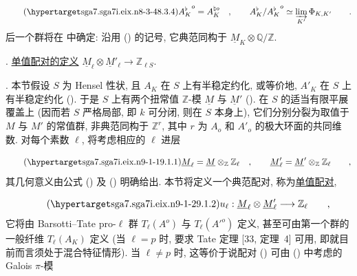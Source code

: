 \begin{equation}\tag{\SGARefTarget{sga7.sga7i.eix.n8-3-4}{8.3.4}}
{A_{K}^{\flat}}^{o}=A_{K}^{\natural o} \quad , \qquad
A^{\flat}_{K}/{A_{K}^{\flat}}^{o}
 \simeq \varinjlim_{K'}\Phi_{K,K'} \qquad .
\end{equation}
后一个群将在  中确定: 沿用 () 的记号, 它典范同构于 $\underline{M}_{K}\otimes\mathbb{Q}/\mathbb{Z}$.



\medskip
{}. \underline{单值配对的定义}
$\underline{M}_{\ell}\otimes\underline{M}'_{\ell}
 \longrightarrow \mathbb{Z}_{\ell S}$.

\medskip
\noindent
{}. 本节假设 $S$ 为 Hensel 性状, 且 $A_K$ 在 $S$ 上有半稳定约化, 或等价地, $A'_K$ 在 $S$ 上有半稳定约化 (). 于是 $S$ 上有两个扭常值 $\mathbb{Z}$-模 $\underline{M}$ 与 $\underline{M}'$ (). 在 $S$ 的适当有限平展覆盖上 (因而若 $S$ 严格局部, 即 $k$ 可分闭, 则在 $S$ 本身上), 它们分别分裂为取值于 $M$ 与 $M'$ 的常值群, 非典范同构于 $\mathbb{Z}^{r}$, 其中 $r$ 为 $A_o$ 和 $A'_o$ 的极大环面的共同维数. 对每个素数 $\ell$, 将考虑相应的 $\ell$ 进层

\begin{equation}\tag{\SGARefTarget{sga7.sga7i.eix.n9-1-1}{9.1.1}}
\underline{M}_{\ell}=\underline{M}\otimes_{\mathbb{Z}}\mathbb{Z}_{\ell}
 \quad , \qquad
\underline{M}'_{\ell}=\underline{M}'\otimes_{\mathbb{Z}}\mathbb{Z}_{\ell}
 \qquad ,
\end{equation}
其几何意义由公式 () 及 () 明确给出. 本节将定义一个典范配对, 称为\underline{单值配对},

\begin{equation}\tag{\SGARefTarget{sga7.sga7i.eix.n9-1-2}{9.1.2}}
u_{\ell}:\underline{M}_{\ell}\otimes\underline{M}'_{\ell}
 \longrightarrow\mathbb{Z}_{\ell} \qquad ,
\end{equation}
它将由 Barsotti--Tate pro-$\ell$ 群 $T_{\ell}(A^{o})$ 与 $T_{\ell}({A'}^{o})$ 定义, 甚至可由第一个群的一般纤维 $T_{\ell}(A_K)$ 定义 (当 $\ell=p$ 时, 要求 Tate 定理 [33, 定理~4] 可用, 即就目前而言须处于混合特征情形). 当 $\ell\neq p$ 时, 这等价于说配对 () 可由 () 中考虑的 Galois $\pi$-模

